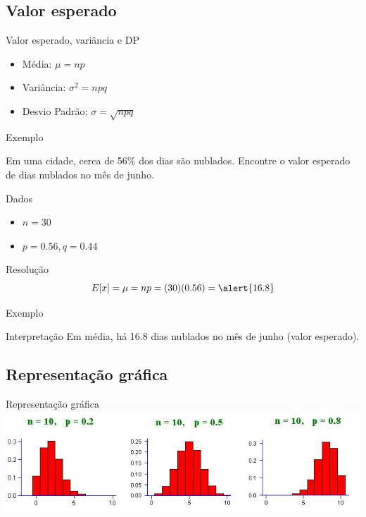 \documentclass{beamer}
\begin{document}
\subsection{Valor esperado}

\begin{frame}{Valor esperado, variância e DP}
  \begin{itemize}
  \item Média: $\mu = np$
  \item Variância: $\sigma^2 = npq$
  \item Desvio Padrão: $\sigma =\sqrt{npq}$
  \end{itemize}
\end{frame}

\begin{frame}{Exemplo}
  \begin{example}
    Em uma cidade, cerca de 56\% dos dias são nublados.
    Encontre o valor esperado de dias nublados no mês de junho.
  \end{example}
  \begin{block}{Dados}
    \begin{itemize}
    \item $n = 30$
    \item $p = 0.56, q = 0.44$
    \end{itemize}
  \end{block}
  \begin{block}{Resolução}
    \begin{displaymath}
      E[x] = \mu = np = (30)(0.56) = \alert{16.8}
    \end{displaymath}
  \end{block}
\end{frame}

\begin{frame}{Exemplo}
  \begin{block}{Interpretação}
    Em média, há 16.8 dias nublados no mês de junho (valor esperado).
  \end{block}
\end{frame}

\subsection{Representação gráfica}

\begin{frame}{Representação gráfica}
\includegraphics[width=\textwidth]{Prob_II/binomial}
\end{frame}
\end{document}
